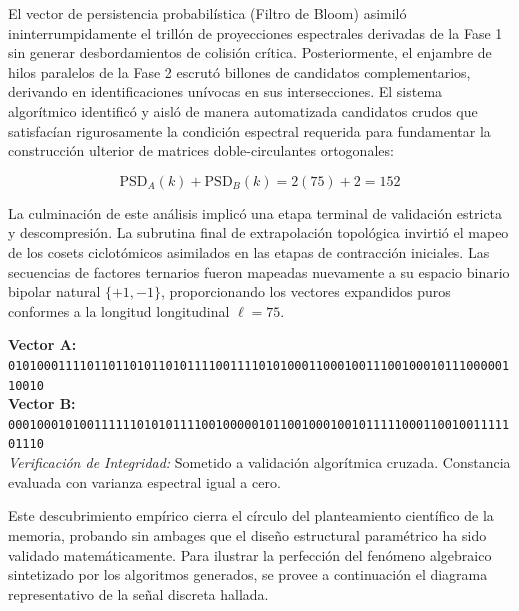 \documentclass[12pt,a4paper]{tfg_domingo}
\begin{document}
El vector de persistencia probabilística (Filtro de Bloom) asimiló
ininterrumpidamente el trillón de proyecciones espectrales derivadas
de la Fase 1 sin generar desbordamientos de colisión
crítica. Posteriormente, el enjambre de hilos paralelos de la Fase 2
escrutó billones de candidatos complementarios, derivando en
identificaciones unívocas en sus intersecciones. El sistema
algorítmico identificó y aisló de manera automatizada candidatos
crudos que satisfacían rigurosamente la condición espectral requerida
para fundamentar la construcción ulterior de matrices
doble-circulantes ortogonales: 

\[ \text{PSD}_A(k) + \text{PSD}_B(k) = 2(75) + 2 = 152 \]

La culminación de este análisis implicó una etapa terminal de
validación estricta y descompresión. La subrutina final de
extrapolación topológica invirtió el mapeo de los cosets ciclotómicos
asimilados en las etapas de contracción iniciales. Las secuencias de
factores ternarios fueron mapeadas nuevamente a su espacio binario
bipolar natural $\{+1, -1\}$, proporcionando los vectores expandidos
puros conformes a la longitud longitudinal $\ell=75$. 

\begin{tcolorbox}[colback=blue!5!white,colframe=blue!75!black,title=\textbf{Certificación Analítica del Par de Legendre Hallado ($\ell=75$)} ]
        \parbox{1\textwidth}{
            \centering
            
            \textbf{Vector A:} \\
            \texttt{010100011110110110101101011110011110101000110001001110010001011100000110010} \\
            \vspace{0.3cm}
            \textbf{Vector B:} \\
            \texttt{000100010100111111010101111001000001011001000100101111100011001001111101110} \\
            \vspace{0.5cm}
            \textit{Verificación de Integridad:} Sometido a validación algorítmica cruzada. Constancia evaluada con varianza espectral igual a cero.
            \vspace{0.5cm}
        }
    
\end{tcolorbox}
Este descubrimiento empírico cierra el círculo del planteamiento científico de la memoria, probando sin ambages que el diseño estructural paramétrico ha sido validado matemáticamente. Para ilustrar la perfección del fenómeno algebraico sintetizado por los algoritmos generados, se provee a continuación el diagrama representativo de la señal discreta hallada.
\end{document}
